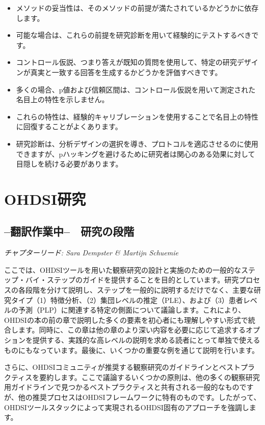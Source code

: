 \documentclass[
  11pt]{book}
\makeatletter
\newenvironment{kframe}{%
\medskip{}
\setlength{\fboxsep}{.8em}
 \def\at@end@of@kframe{}%
 \ifinner\ifhmode%
  \def\at@end@of@kframe{\end{minipage}}%
  \begin{minipage}{\columnwidth}%
 \fi\fi%
 \def\FrameCommand##1{\hskip\@totalleftmargin \hskip-\fboxsep
 \colorbox{myShadeColor}{##1}\hskip-\fboxsep
     \hskip-\linewidth \hskip-\@totalleftmargin \hskip\columnwidth}%
 \MakeFramed {\advance\hsize-\width
   \@totalleftmargin\z@ \linewidth\hsize
   \@setminipage}}%
 {\par\unskip\endMakeFramed%
 \at@end@of@kframe}
\newenvironment{rmdblock}[1]
  {
  \begin{itemize}
  \renewcommand{\labelitemi}{
    \raisebox{-.7\height}[0pt][0pt]{
      {\setkeys{Gin}{width=3em,keepaspectratio}\texttt{[image: images/\#1]}}
    }
  }
  \setlength{\fboxsep}{1em}
  \begin{kframe}
  \item
  }
  {
  \end{kframe}
  \end{itemize}
  }
\newenvironment{rmdsummary}
  {\begin{rmdblock}{summary}}
  {\end{rmdblock}}
\theoremstyle{definition}
\theoremstyle{definition}
\theoremstyle{definition}
\theoremstyle{definition}
\theoremstyle{remark}
\makeatother
\begin{document}
\begin{rmdsummary}
\begin{itemize}
\item
  メソッドの妥当性は、そのメソッドの前提が満たされているかどうかに依存します。
\item
  可能な場合は、これらの前提を研究診断を用いて経験的にテストするべきです。
\item
  コントロール仮説、つまり答えが既知の質問を使用して、特定の研究デザインが真実と一致する回答を生成するかどうかを評価すべきです。
\item
  多くの場合、p値および信頼区間は、コントロール仮説を用いて測定された名目上の特性を示しません。
\item
  これらの特性は、経験的キャリブレーションを使用することで名目上の特性に回復することがよくあります。
\item
  研究診断は、分析デザインの選択を導き、プロトコルを適応させるのに使用できますが、pハッキングを避けるために研究者は関心のある効果に対して目隠しを続ける必要があります。
\end{itemize}
\end{rmdsummary}

\part{OHDSI研究}\label{part-ohdsiux7814ux7a76}

\chapter{--翻訳作業中--　研究の段階}\label{StudySteps}

\emph{チャプターリード: Sara Dempster \& Martijn Schuemie}

ここでは、OHDSIツールを用いた観察研究の設計と実施のための一般的なステップ・バイ・ステップのガイドを提供することを目的としています。研究プロセスの各段階を分けて説明し、ステップを一般的に説明するだけでなく、主要な研究タイプ（1）特徴分析、（2）集団レベルの推定（PLE）、および（3）患者レベルの予測（PLP）に関連する特定の側面について議論します。これにより、OHDSIの本の前の章で説明した多くの要素を初心者にも理解しやすい形式で統合します。同時に、この章は他の章のより深い内容を必要に応じて追求するオプションを提供する、実践的な高レベルの説明を求める読者にとって単独で使えるものにもなっています。最後に、いくつかの重要な例を通じて説明を行います。

さらに、OHDSIコミュニティが推奨する観察研究のガイドラインとベストプラクティスを要約します。ここで議論するいくつかの原則は、他の多くの観察研究用ガイドラインで見つかるベストプラクティスと共有される一般的なものですが、他の推奨プロセスはOHDSIフレームワークに特有のものです。したがって、OHDSIツールスタックによって実現されるOHDSI固有のアプローチを強調します。
\end{document}
